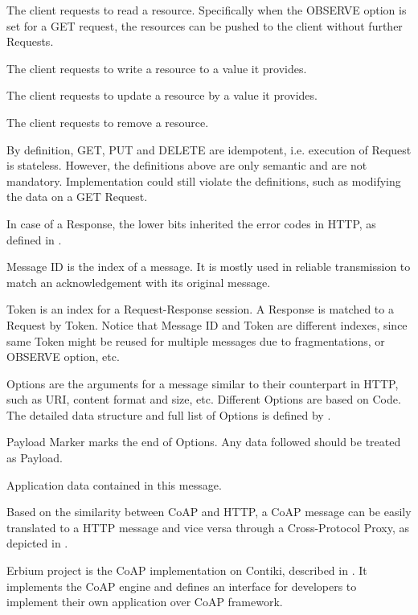 \begin{description}[style=nextline]
\begin{description}[style=nextline]
		The client requests to read a resource. Specifically when the OBSERVE option is set for a GET request, the resources can be pushed to the client  without further Requests\cite{rfc7641}.
		\item[\textbf{PUT}] 
		The client requests to write a resource to a value it provides.
		\item[\textbf{POST}] 
		The client requests to update a resource by a value it provides.
		\item[\textbf{DELETE}]
		 The client requests to remove a resource.
	\end{description}
	By definition, GET, PUT and DELETE are idempotent, i.e. execution of Request is stateless. However, the definitions above are only semantic and are not mandatory. Implementation could still violate the definitions, such as modifying the data on a GET Request.
	
	In case of a Response, the lower bits inherited the error codes in HTTP, as defined in \cite{rfc2616}.
	\item[\textbf{Message ID}]
	Message ID is the index of a message. It is mostly used in reliable transmission to match an acknowledgement with its original message.
	\item[\textbf{Token}]
	Token is an index for a Request-Response session. A Response is matched to a Request by Token. Notice that Message ID and Token are different indexes, since same Token might be reused for multiple messages due to fragmentations, or OBSERVE option, etc.
	\item[\textbf{Options}]
	Options are the arguments for a message similar to their counterpart in HTTP, such as URI, content format and size, etc. Different Options are based on Code. The detailed data structure and full list of Options is defined by \cite{rfc7252}.
	\item[\textbf{Payload Marker}]
	Payload Marker marks the end of Options. Any data followed should be treated as Payload.
	\item[\textbf{Payload}]
	Application data contained in this message. 
\end{description}

Based on the similarity between CoAP and HTTP, a CoAP message can be easily translated to a HTTP message and vice versa through a Cross-Protocol Proxy, as depicted in \cite{rfc7252}.

Erbium\cite{Erbium} project is the CoAP implementation on Contiki, described in \cite{ContikiCoap}. It implements the CoAP engine and defines an interface for developers to implement their own application over CoAP framework. 

